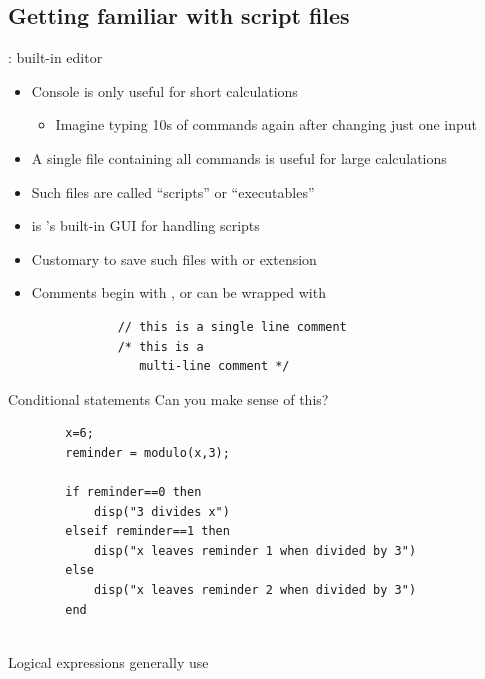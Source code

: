\subsection{Getting familiar with script files}
\begin{frame}[fragile]{\scinotes: built-in editor}
    \begin{itemize}
        \setitemsep{1em}
        \item Console is only useful for short calculations
        \begin{itemize}
            \item Imagine typing 10s of commands again after changing just one input
        \end{itemize}
        \item<2-> A single file containing all commands is useful for large calculations
        \item<3-> Such files are called ``scripts'' or ``executables''
        \item<4-> \scinotes{} is \scilab's built-in GUI for handling scripts
        \item<5-> Customary to save such files with  or  extension
        \item<6-> Comments begin with \inlinecode{//}, or can be wrapped with \inlinecode{/* */}
        \begin{lstlisting}
            // this is a single line comment
            /* this is a
               multi-line comment */
        \end{lstlisting}
    \end{itemize}
\end{frame}

\begin{frame}[fragile]{Conditional statements}
    Can you make sense of this?
    \begin{lstlisting}
        x=6;
        reminder = modulo(x,3);
        
        if reminder==0 then
            disp("3 divides x")
        elseif reminder==1 then
            disp("x leaves reminder 1 when divided by 3")
        else
            disp("x leaves reminder 2 when divided by 3")
        end
    \end{lstlisting}
    \\[1em]
    Logical expressions generally use 
\end{frame}

